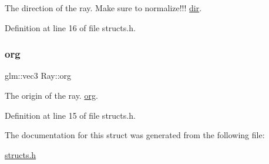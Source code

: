 The direction of the ray. Make sure to normalize!!! \mbox{\hyperlink{struct_ray_a666e66ac32a5462ae95161a361e91951}{dir}}. 



Definition at line 16 of file structs.\+h.

\mbox{\label{struct_ray_a37337cf8775a751e2d58de86ffccebec}} 
\subsubsection{\texorpdfstring{org}{org}}
{\footnotesize\ttfamily glm\+::vec3 Ray\+::org}



The origin of the ray. \mbox{\hyperlink{struct_ray_a37337cf8775a751e2d58de86ffccebec}{org}}. 



Definition at line 15 of file structs.\+h.



The documentation for this struct was generated from the following file\+:\begin{DoxyCompactItemize}
\item 
\mbox{\hyperlink{structs_8h}{structs.\+h}}\end{DoxyCompactItemize}
